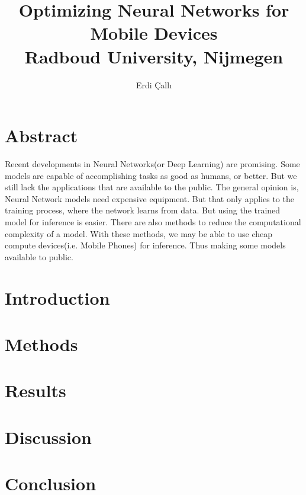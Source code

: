\documentclass[12pt]{report}
\title{
{Optimizing Neural Networks for Mobile Devices}\\
{\large Radboud University, Nijmegen}
}
\author{Erdi \c{C}all{\i}}
\begin{document}
\maketitle
\chapter*{Abstract}
Recent developments in Neural Networks(or Deep Learning) are promising. Some models are capable of accomplishing tasks as good as humans, or better. But we still lack the applications that are available to the public. The general opinion is, Neural Network models need expensive equipment. But that only applies to the training process, where the network learns from data. But using the trained model for inference is easier. There are also methods to reduce the computational complexity of a model. With these methods, we may be able to use cheap compute devices(i.e. Mobile Phones) for inference. Thus making some models available to public. 




\tableofcontents

\chapter{Introduction}


\chapter{Methods}


\chapter{Results}


\chapter{Discussion}


\chapter{Conclusion}






\end{document}
